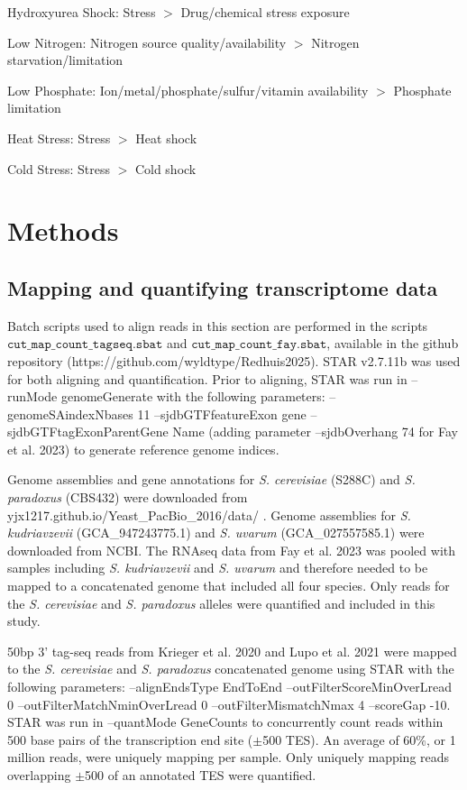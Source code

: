 Hydroxyurea Shock: Stress $>$ Drug/chemical stress exposure

Low Nitrogen: Nitrogen source quality/availability $>$ Nitrogen starvation/limitation

Low Phosphate: Ion/metal/phosphate/sulfur/vitamin availability $>$ Phosphate limitation

Heat Stress: Stress $>$ Heat shock

Cold Stress: Stress $>$ Cold shock

\section{Methods}

\subsection{Mapping and quantifying transcriptome data}

Batch scripts used to align reads in this section are performed in the scripts 
$\texttt{cut\_map\_count\_tagseq.sbat}$ and $\texttt{cut\_map\_count\_fay.sbat}$, available in the github repository (https://github.com/wyldtype/Redhuis2025). STAR v2.7.11b was used for both aligning and quantification. Prior to aligning, STAR was run in --runMode genomeGenerate with the following parameters: --genomeSAindexNbases 11 --sjdbGTFfeatureExon gene --sjdbGTFtagExonParentGene Name (adding parameter --sjdbOverhang 74 for Fay et al. 2023) to generate reference genome indices.

Genome assemblies and gene annotations for \textit{S. cerevisiae} (S288C) and \textit{S. paradoxus} (CBS432) were downloaded from yjx1217.github.io/Yeast\_PacBio\_2016/data/ \cite{Yue2017}. Genome assemblies for \textit{S. kudriavzevii} (GCA\_947243775.1) and \textit{S. uvarum} (GCA\_027557585.1) were downloaded from NCBI. The RNAseq data from Fay et al. 2023 was pooled with samples including \textit{S. kudriavzevii} and \textit{S. uvarum} and therefore needed to be mapped to a concatenated genome that included all four species. Only reads for the \textit{S. cerevisiae} and \textit{S. paradoxus} alleles were quantified and included in this study.

50bp 3' tag-seq reads from Krieger et al. 2020 and Lupo et al. 2021 were mapped to the \textit{S. cerevisiae} and \textit{S. paradoxus} concatenated genome using STAR with the following parameters: --alignEndsType EndToEnd --outFilterScoreMinOverLread 0  --outFilterMatchNminOverLread 0 --outFilterMismatchNmax 4  --scoreGap -10. STAR was run in --quantMode GeneCounts to concurrently count reads within 500 base pairs of the transcription end site ($\pm$500 TES). An average of 60\%, or 1 million reads, were uniquely mapping per sample. Only uniquely mapping reads overlapping $\pm$500 of an annotated TES were quantified.

